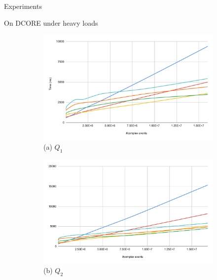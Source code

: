 \documentclass[xcolor=pdftex,dvipsnames,table]{beamer}
\begin{document}
\begin{frame}{Experiments}
  \begin{block}{On DCORE under heavy loads}
    \begin{figure}[H]
        \centering
        \begin{subfigure}[b]{0.4\textwidth}
            \centering
            \includegraphics[width=\textwidth]{experiment_4_chart_1}
            \tiny (a) $Q_{1}$
        \end{subfigure}
        \begin{subfigure}[b]{0.4\textwidth}
            \centering
            \includegraphics[width=\textwidth]{experiment_4_chart_2}
            \tiny (b) $Q_{2}$
        \end{subfigure}
        \begin{center}
        \begin{subfigure}[b]{0.4\textwidth}
            \centering

\end{subfigure}
\end{center}
\end{figure}
\end{block}
\end{frame}
\end{document}
